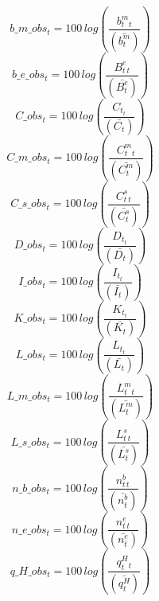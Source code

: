 \begin{dmath}
{b\_m\_obs_{t}}=100\, log\left(\frac{{ b^m_t _{t}}}{(\bar{ b^m_t })}\right)
\end{dmath}
\begin{dmath}
{b\_e\_obs_{t}}=100\, log\left(\frac{{B^e_t_{t}}}{(\bar{B^e_t})}\right)
\end{dmath}
\begin{dmath}
{C\_obs_{t}}=100\, log\left(\frac{{ C_t _{t}}}{(\bar{ C_t })}\right)
\end{dmath}
\begin{dmath}
{C\_m\_obs_{t}}=100\, log\left(\frac{{ C^m_t _{t}}}{(\bar{ C^m_t })}\right)
\end{dmath}
\begin{dmath}
{C\_s\_obs_{t}}=100\, log\left(\frac{{ C^s_t _{t}}}{(\bar{ C^s_t })}\right)
\end{dmath}
\begin{dmath}
{D\_obs_{t}}=100\, log\left(\frac{{ D_t _{t}}}{(\bar{ D_t })}\right)
\end{dmath}
\begin{dmath}
{I\_obs_{t}}=100\, log\left(\frac{{ I_t _{t}}}{(\bar{ I_t })}\right)
\end{dmath}
\begin{dmath}
{K\_obs_{t}}=100\, log\left(\frac{{ K_t _{t}}}{(\bar{ K_t })}\right)
\end{dmath}
\begin{dmath}
{L\_obs_{t}}=100\, log\left(\frac{{ L_t _{t}}}{(\bar{ L_t })}\right)
\end{dmath}
\begin{dmath}
{L\_m\_obs_{t}}=100\, log\left(\frac{{ L^m_t _{t}}}{(\bar{ L^m_t })}\right)
\end{dmath}
\begin{dmath}
{L\_s\_obs_{t}}=100\, log\left(\frac{{ L^s_t _{t}}}{(\bar{ L^s_t })}\right)
\end{dmath}
\begin{dmath}
{n\_b\_obs_{t}}=100\, log\left(\frac{{ n^b_t _{t}}}{(\bar{ n^b_t })}\right)
\end{dmath}
\begin{dmath}
{n\_e\_obs_{t}}=100\, log\left(\frac{{ n^e_t _{t}}}{(\bar{ n^e_t })}\right)
\end{dmath}
\begin{dmath}
{q\_H\_obs_{t}}=100\, log\left(\frac{{ q^H_t  _{t}}}{(\bar{ q^H_t  })}\right)
\end{dmath}
